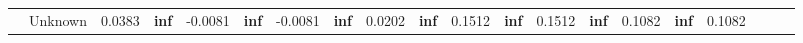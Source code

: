 \begin{table}
\begin{tabular}{llSSSSSSSSSSSSSSSSSS}
		                                      & Unknown       & 0.0383                                    & \bfseries inf                                                                                                                                                                                                                                                                                                                                                                                                            & -0.0081                           & \bfseries inf                                                                                                                                                                                                                                                                                                                                                                                                            & -0.0081                        & \bfseries inf                                                                                                                                                                                                                                                                                                                                                                                                            & 0.0202                             & \bfseries inf                                                                                                                                                                                                                                                                                                                                                                                                            & 0.1512                                                                                                                           & \bfseries inf                                                                                                                                                                                                                                                                                                                                                                                                            & 0.1512           & \bfseries inf                                                                                                                                                                                                                                                                                                                                                                                                            & 0.1082           & \bfseries inf                                                                                                                                                                                                                                                                                                                                                                                                            & 0.1082           & \bfseries 
\end{tabular}
\end{table}
